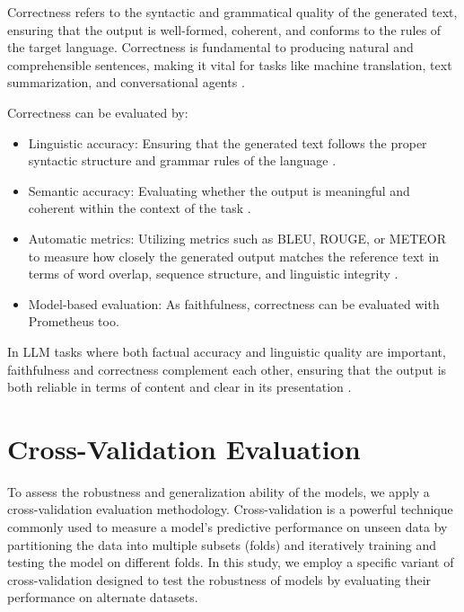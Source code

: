 Correctness refers to the syntactic and grammatical quality of the generated text, ensuring that the output is well-formed, coherent, and conforms to the rules of the target language. Correctness is fundamental to producing natural and comprehensible sentences, making it vital for tasks like machine translation, text summarization, and conversational agents \cite{yao2023predictinggeneralizationperformancecorrectness}.

Correctness can be evaluated by: \begin{itemize} \item Linguistic accuracy: Ensuring that the generated text follows the proper syntactic structure and grammar rules of the language \cite{varshney-etal-2022-towards}. \item Semantic accuracy: Evaluating whether the output is meaningful and coherent within the context of the task \cite{steen2023littlepushnlimodels}. \item Automatic metrics: Utilizing metrics such as BLEU, ROUGE, or METEOR to measure how closely the generated output matches the reference text in terms of word overlap, sequence structure, and linguistic integrity \cite{gat2023faithfulexplanationsblackboxnlp}. \item Model-based evaluation: As faithfulness, correctness can be evaluated with Prometheus too\cite{kim2024prometheus2opensource}.\end{itemize}

In LLM tasks where both factual accuracy and linguistic quality are important, faithfulness and correctness complement each other, ensuring that the output is both reliable in terms of content and clear in its presentation \cite{jacovi-goldberg-2020-towards}.

\section{Cross-Validation Evaluation}

To assess the robustness and generalization ability of the models, we apply a cross-validation evaluation methodology. Cross-validation is a powerful technique commonly used to measure a model's predictive performance on unseen data by partitioning the data into multiple subsets (folds) and iteratively training and testing the model on different folds. In this study, we employ a specific variant of cross-validation designed to test the robustness of models by evaluating their performance on alternate datasets.

